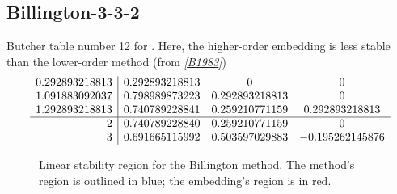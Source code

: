 \documentclass[letterpaper,10pt,english]{sphinxmanual}
\begin{document}
\subsection{Billington-3-3-2}
\label{Butcher:butcher-billington}\label{Butcher:billington-3-3-2}
Butcher table number 12
for {\hyperref[c_interface/User_callable:c.ARKodeSetIRKTableNum]{\emph{}}}.  Here, the
higher-order embedding is less stable than the lower-order method
(from \label{Butcher:id11}{\hyperref[References:b1983]{\emph{{[}B1983{]}}}})
\begin{gather}
\begin{split}\begin{array}{r|ccc}
  0.292893218813 & 0.292893218813 & 0 & 0 \\
  1.091883092037 & 0.798989873223 & 0.292893218813 & 0 \\
  1.292893218813 & 0.740789228841 & 0.259210771159 & 0.292893218813 \\
  \hline
  2 & 0.740789228840 & 0.259210771159 & 0 \\
  3 & 0.691665115992 & 0.503597029883 & -0.195262145876
\end{array}\end{split}\notag
\end{gather}\begin{figure}[htbp]
\centering
\capstart

\caption{Linear stability region for the Billington method.  The method's
region is outlined in blue; the embedding's region is in red.}\end{figure}
\end{document}
